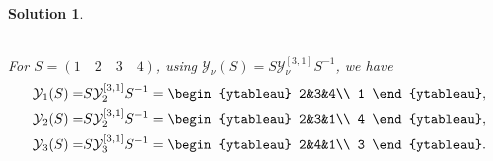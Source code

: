 \documentclass[UTF8,10pt,a4paper]{article}
\theoremstyle{Problem}
\theoremstyle{Solution}
\newtheorem*{sol}{Solution}
\begin{document}
\begin{sol}
\begin{table}[h]
\begin{tabular}{c|ccc}
        \end{tabular}
    \end{table}
    For $S=(1\quad 2\quad 3\quad 4)$, using $\mathcal{Y}_{\nu}(S)=S\mathcal{Y}_{\nu}^{[3,1]}S^{-1}$, we have
    \begin{align}
        \mathcal{Y}_1(S)=&S\mathcal{Y}_2^{[3,1]}S^{-1}=\begin{ytableau}
            2&3&4\\
            1
        \end{ytableau},\\
        \mathcal{Y}_2(S)=&S\mathcal{Y}_2^{[3,1]}S^{-1}=\begin{ytableau}
            2&3&1\\
            4
        \end{ytableau},\\
        \mathcal{Y}_3(S)=&S\mathcal{Y}_3^{[3,1]}S^{-1}=\begin{ytableau}
            2&4&1\\
            3
        \end{ytableau}.
    \end{align}
\end{sol}
\end{document}
